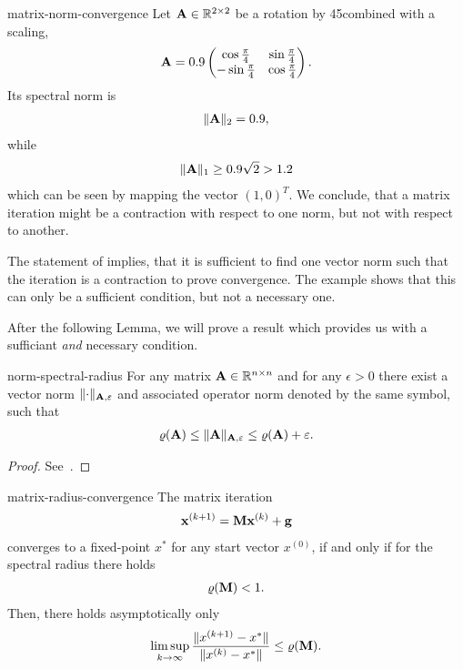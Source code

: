 \begin{Example}{matrix-norm-convergence}
  Let $\mathbf A\in\mathbb R^{2\times 2}$ be a rotation by 45\textdegree combined
  with a scaling,
  \begin{gather}
    \mathbf A = 0.9
    \begin{pmatrix}
      \cos \tfrac\pi4 &\sin\tfrac\pi4\\
      -\sin\tfrac\pi4&\cos\tfrac\pi4
    \end{pmatrix}.
  \end{gather}
  Its spectral norm is
  \begin{gather}
    \lVert\mathbf A\rVert_2 = 0.9,
  \end{gather}
  while
  \begin{gather}
    \lVert\mathbf A\rVert_1 \ge 0.9\sqrt2 > 1.2
  \end{gather}
  which can be seen by mapping the vector $(1,0)^T$. We conclude, that
  a matrix iteration might be a contraction with respect to one norm,
  but not with respect to another.
\end{Example}

\begin{remark}
  The statement of 
  implies, that it is sufficient to find one vector norm such that the
  iteration is a contraction to prove convergence. The example shows
  that this can only be a sufficient condition, but not a necessary
  one.

  After the following Lemma, we will prove a result which provides us
  with a sufficiant \emph{and} necessary condition.
\end{remark}

\begin{Lemma}{norm-spectral-radius}
  For any matrix $\mathbf A\in\mathbb R^{n\times n}$ and for any $\epsilon>0$ there exist a
  vector norm $\lVert\cdot\rVert_{\mathbf A,\varepsilon}$ and associated operator norm
  denoted by the same symbol, such that
  \begin{gather}
    \varrho(\mathbf A) \le \lVert\mathbf A\rVert_{\mathbf A,\varepsilon} \le \varrho(\mathbf A)+\varepsilon.
  \end{gather}
\end{Lemma}

\begin{proof}
  See~\cite[Lemma 3.1]{Rannacher18nla}.
\end{proof}

\begin{Theorem}{matrix-radius-convergence}
  The matrix iteration
  \begin{gather}
    \mathbf x^{(k+1)} = \mathbf M \mathbf x^{(k)} + \mathbf g
  \end{gather}
  converges to a fixed-point $x^*$ for any start vector $x^{(0)}$,
  if and only if for the spectral radius there holds
  \begin{gather}
    \varrho(\mathbf M) < 1.
  \end{gather}
  Then, there holds asymptotically only
  \begin{gather}
    \operatorname*{lim\,sup}_{k\to\infty} \frac{\lVert x^{(k+1)}-x^*\rVert}{\lVert x^{(k)}-x^*\rVert}
    \le \varrho(\mathbf M).
  \end{gather}
\end{Theorem}

